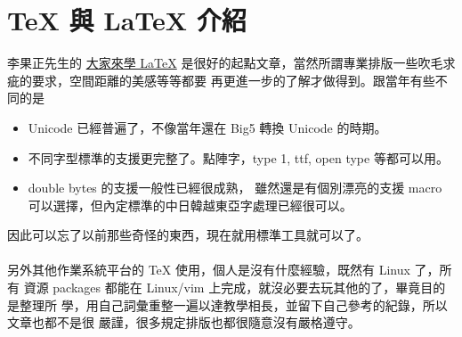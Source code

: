 \chapter{{\TeX} 與 {\LaTeX} 介紹}
李果正先生的
\href{https://github.com/TeXtw/LaTeX123/releases/download/v1.0/latex123.pdf}
{大家來學 \LaTeX{}}
是很好的起點文章，當然所謂專業排版一些吹毛求疵的要求，空間距離的美感等等都要
再更進一步的了解才做得到。跟當年有些不同的是
\begin{itemize}
  \item Unicode 已經普遍了，不像當年還在 Big5 轉換 Unicode 的時期。
  \item 不同字型標準的支援更完整了。點陣字，type 1, ttf, open type 等都可以用。
  \item double bytes 的支援一般性已經很成熟， 雖然還是有個別漂亮的支援 macro
    可以選擇，但內定標準的中日韓越東亞字處理已經很可以。
\end{itemize}
因此可以忘了以前那些奇怪的東西，現在就用標準工具就可以了。
\\\\
另外其他作業系統平台的 \TeX{} 使用，個人是沒有什麼經驗，既然有 Linux 了，所有
資源 packages 都能在 Linux/vim 上完成，就沒必要去玩其他的了，畢竟目的是整理所
學，用自己詞彙重整一遍以達教學相長，並留下自己參考的紀錄，所以文章也都不是很
嚴謹，很多規定排版也都很隨意沒有嚴格遵守。

